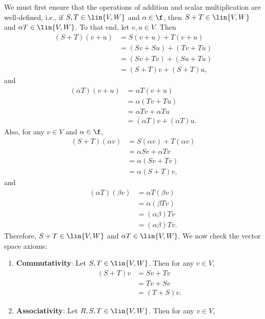 \begin{sol}
    We must first ensure that the operations of addition and scalar multiplication are well-defined, i.e., if $S, T \in \lin{V, W}$ and $\alpha \in \f$, then $S + T \in \lin{V, W}$ and $\alpha T \in \lin{V, W}$. To that end, let $v, u \in V$. Then
    \begin{align*}
        (S + T)(v + u) & = S(v + u) + T(v + u) \\
        & = (Sv + Su) + (Tv + Tu) \\
        & = (Sv + Tv) + (Su + Tu) \\
        & = (S + T)v + (S + T)u,
    \end{align*}
    and
    \begin{align*}
        (\alpha T)(v + u) & = \alpha T(v + u) \\
        & = \alpha (Tv + Tu) \\
        & = \alpha Tv + \alpha Tu \\
        & = (\alpha T)v + (\alpha T)u.
    \end{align*}
    Also, for any $v \in V$ and $\alpha \in \f$,
    \begin{align*}
        (S + T)(\alpha v) & = S(\alpha v) + T(\alpha v) \\
        & = \alpha Sv + \alpha Tv \\
        & = \alpha (Sv + Tv) \\
        & = \alpha (S + T)v,
    \end{align*}
    and
    \begin{align*}
        (\alpha T)(\beta v) & = \alpha T(\beta v) \\
        & = \alpha (\beta Tv) \\
        & = (\alpha \beta) Tv \\
        & = (\alpha \beta) T v.
    \end{align*}
    Therefore, $S + T \in \lin{V, W}$ and $\alpha T \in \lin{V, W}$. We now check the vector space axioms:
    \begin{enumerate}
        \item \textbf{Commutativity}: Let $S, T \in \lin{V, W}$. Then for any $v \in V$,
        \begin{align*}
            (S + T)v & = Sv + Tv \\
            & = Tv + Sv \\
            & = (T + S)v.
        \end{align*}
        \item \textbf{Associativity}: Let $R, S, T \in \lin{V, W}$. Then for any $v \in V$,

\end{enumerate}
\end{sol}
